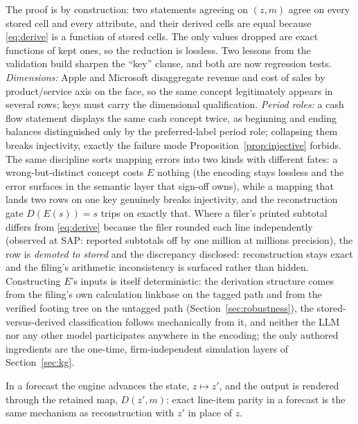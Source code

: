 \documentclass[11pt]{article}
\begin{document}
The proof is by construction: two statements agreeing on $(z, m)$ agree on every stored cell and every attribute, and their derived cells are equal because \eqref{eq:derive} is a function of stored cells. The only values dropped are exact functions of kept ones, so the reduction is lossless. Two lessons from the validation build sharpen the ``key'' clause, and both are now regression tests. \emph{Dimensions:} Apple and Microsoft disaggregate revenue and cost of sales by product/service axis on the face, so the same concept legitimately appears in several rows; keys must carry the dimensional qualification. \emph{Period roles:} a cash flow statement displays the same cash concept twice, as beginning and ending balances distinguished only by the preferred-label period role; collapsing them breaks injectivity, exactly the failure mode Proposition~\ref{prop:injective} forbids. The same discipline sorts mapping errors into two kinds with different fates: a wrong-but-distinct concept costs $E$ nothing (the encoding stays lossless and the error surfaces in the semantic layer that sign-off owns), while a mapping that lands two rows on one key genuinely breaks injectivity, and the reconstruction gate $D(E(s)) = s$ trips on exactly that. Where a filer's printed subtotal differs from \eqref{eq:derive} because the filer rounded each line independently (observed at SAP: reported subtotals off by one million at millions precision), the row is \emph{demoted to stored} and the discrepancy disclosed: reconstruction stays exact and the filing's arithmetic inconsistency is surfaced rather than hidden. Constructing $E$'s inputs is itself deterministic: the derivation structure comes from the filing's own calculation linkbase on the tagged path and from the verified footing tree on the untagged path (Section~\ref{sec:robustness}), the stored-versus-derived classification follows mechanically from it, and neither the LLM nor any other model participates anywhere in the encoding; the only authored ingredients are the one-time, firm-independent simulation layers of Section~\ref{sec:kg}.

In a forecast the engine advances the state, $z \mapsto z'$, and the output is rendered through the retained map, $D(z', m)$: exact line-item parity in a forecast is the same mechanism as reconstruction with $z'$ in place of $z$.
\end{document}
